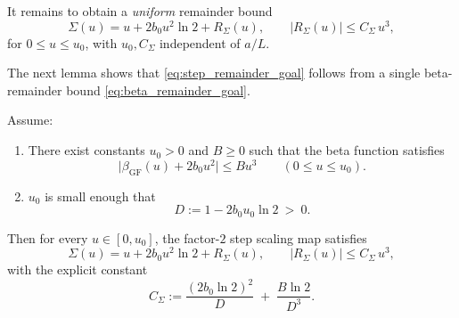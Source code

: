 It remains to obtain a \emph{uniform} remainder bound
\begin{equation}
\label{eq:step_remainder_goal}
\Sigma(u)=u+2b_0u^2\ln 2 + R_\Sigma(u),\qquad |R_\Sigma(u)|\le C_\Sigma\,u^3,
\end{equation}
for $0\le u\le u_0$, with $u_0,C_\Sigma$ independent of $a/L$.

The next lemma shows that \eqref{eq:step_remainder_goal} follows from a single beta-remainder bound \eqref{eq:beta_remainder_goal}.

\begin{lemma}
\label{lem:beta_to_step_remainder}
Assume:
\begin{enumerate}
\item There exist constants $u_0>0$ and $B\ge 0$ such that the beta function satisfies
\begin{equation}
\label{eq:beta_remainder_assumption}
\bigl|\beta_{\mathrm{GF}}(u)+2b_0u^2\bigr|\le B u^3\qquad (0\le u\le u_0).
\end{equation}
\item $u_0$ is small enough that
\begin{equation}
\label{eq:u0_smallness}
D:=1-2b_0u_0\ln 2\ >\ 0.
\end{equation}
\end{enumerate}
Then for every $u\in[0,u_0]$, the factor-$2$ step scaling map satisfies
\begin{equation}
\label{eq:step_expansion_bound}
\Sigma(u)=u+2b_0u^2\ln 2 + R_\Sigma(u),
\qquad |R_\Sigma(u)|\le C_\Sigma\,u^3,
\end{equation}
with the explicit constant
\begin{equation}
\label{eq:Csigma}
C_\Sigma := \frac{(2b_0\ln 2)^2}{D}\; +\; \frac{B\ln 2}{D^3}.
\end{equation}
\end{lemma}

